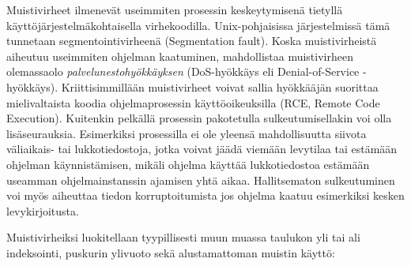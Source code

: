 Muistivirheet ilmenevät useimmiten prosessin keskeytymisenä tietyllä
käyt\-tö\-jär\-jes\-tel\-mä\-koh\-tai\-sel\-la virhekoodilla.
Unix-pohjaisissa järjestelmissä tämä tunnetaan segmentointivirheenä (Segmentation fault).
Koska muistivirheistä aiheutuu useimmiten ohjelman kaatuminen,
mahdollistaa muistivirheen olemassaolo \emph{palvelunestohyökkäyksen} (DoS-hyökkäys eli Denial-of-Service -hyökkäys).
Kriittisimmillään muistivirheet voivat sallia hyökkääjän suorittaa mielivaltaista koodia
ohjelmaprosessin käyttöoikeuksilla (RCE, Remote Code Execution). 
Kuitenkin pelkällä prosessin pakotetulla sulkeutumisellakin voi olla lisäseurauksia.
Esimerkiksi prosessilla ei ole yleensä mahdollisuutta siivota väliaikais- tai lukkotiedostoja,
jotka voivat jäädä viemään levytilaa tai estämään ohjelman käyn\-nis\-tä\-mi\-sen,
mikäli ohjelma käyttää lukkotiedostoa es\-tä\-mään useamman ohjelmainstanssin ajamisen yhtä aikaa.
Hallitsematon sulkeutuminen voi myös aiheuttaa tiedon korruptoitumista jos ohjelma kaatuu esimerkiksi kesken levykirjoitusta.

Muistivirheiksi luokitellaan tyypillisesti muun muassa
taulukon yli tai ali indeksointi, puskurin ylivuoto sekä alustamattoman muistin käyttö:

